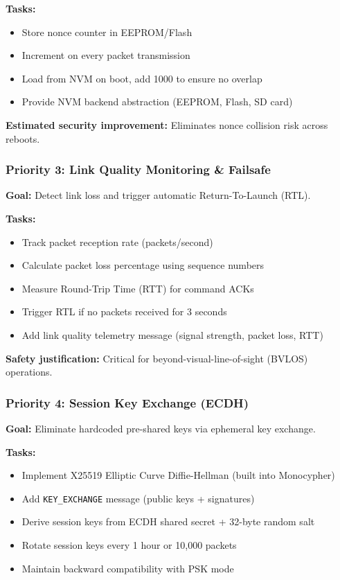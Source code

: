 \documentclass[11pt,a4paper]{article}
\begin{document}
\textbf{Tasks:}
\begin{itemize}[noitemsep]
    \item Store nonce counter in EEPROM/Flash
    \item Increment on every packet transmission
    \item Load from NVM on boot, add 1000 to ensure no overlap
    \item Provide NVM backend abstraction (EEPROM, Flash, SD card)
\end{itemize}

\textbf{Estimated security improvement:} Eliminates nonce collision risk across reboots.

\subsubsection{Priority 3: Link Quality Monitoring \& Failsafe}
\textbf{Goal:} Detect link loss and trigger automatic Return-To-Launch (RTL).

\textbf{Tasks:}
\begin{itemize}[noitemsep]
    \item Track packet reception rate (packets/second)
    \item Calculate packet loss percentage using sequence numbers
    \item Measure Round-Trip Time (RTT) for command ACKs
    \item Trigger RTL if no packets received for 3 seconds
    \item Add link quality telemetry message (signal strength, packet loss, RTT)
\end{itemize}

\textbf{Safety justification:} Critical for beyond-visual-line-of-sight (BVLOS) operations.

\subsubsection{Priority 4: Session Key Exchange (ECDH)}
\textbf{Goal:} Eliminate hardcoded pre-shared keys via ephemeral key exchange.

\textbf{Tasks:}
\begin{itemize}[noitemsep]
    \item Implement X25519 Elliptic Curve Diffie-Hellman (built into Monocypher)
    \item Add \texttt{KEY\_EXCHANGE} message (public keys + signatures)
    \item Derive session keys from ECDH shared secret + 32-byte random salt
    \item Rotate session keys every 1 hour or 10{,}000 packets
    \item Maintain backward compatibility with PSK mode
\end{itemize}
\end{document}
